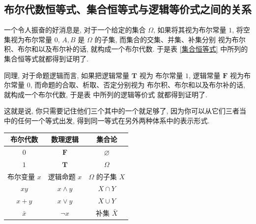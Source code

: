 \documentclass[10pt,UTF8]{book} %
\begin{document}
\subsection{布尔代数恒等式、集合恒等式与逻辑等价式之间的关系}

一个令人振奋的好消息是, 对于一个给定的集合 $\varOmega$, 如果将其视为布尔常量 $1$,
将空集视为布尔常量 $0$, $A,B$ 是 $\varOmega$ 的子集, 而集合的交集、并集、补集分别
视为布尔积、布尔和以及布尔补的话, 就构成一个布尔代数. 于是表 \ref{集合恒等式} 中所列的
集合恒等式就都得到证明了. 

同理, 对于命题逻辑而言, 如果把逻辑常量 $\mathbf{T}$ 视为
布尔常量 $1$, 逻辑常量 $\mathbf{F}$ 视为布尔常量 $0$, 而命题的合取、析取、否定分别视为
布尔积、布尔和以及布尔补的话, 就构成一个布尔代数, 于是表 中所列的逻辑等价式
就都得到证明了.

这就是说, 你只需要记住他们三个其中的一个就足够了, 因为你可以从它们三者当中的任何一个等式出发,
得到同一等式在另外两种体系中的表示形式.

{ %
\label{布尔代数、集合运算与逻辑运算之间的关系} %
\begin{longtable}{ccc}
    \toprule
    \textbf{布尔代数} & \textbf{数理逻辑} & \textbf{集合论} \\
    \toprule
    \endhead
    \bottomrule
    \endfoot

    $0$ & $\mathbf{F}$ & $\varnothing$ \\ 
    $1$ & $\mathbf{T}$ & $\varOmega$ \\ 
    布尔变量 $x$ & 逻辑命题 $x$ & $\Omega$ 的子集 $X$ \\
    $xy$ & $x \wedge y$ & $X \cap Y$ \\ 
    $x+y$ & $x \vee y$ & $X \cup Y$ \\
    $\bar x$ & $\lnot x$ & 补集 $\bar X$ \\
\end{longtable}}


\end{document}
